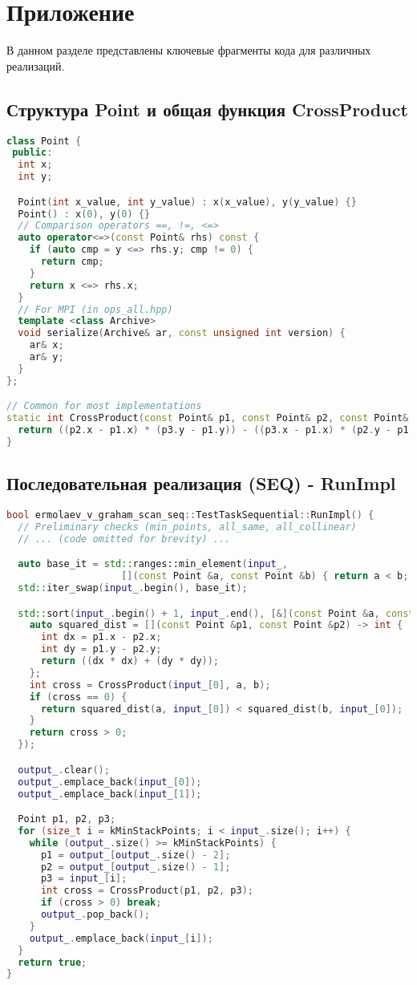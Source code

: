 \documentclass[12pt]{article}
\begin{document}
\newpage
\section{Приложение}

В данном разделе представлены ключевые фрагменты кода для различных реализаций.

\subsection{Структура Point и общая функция CrossProduct}
\begin{lstlisting}[language=C++]
class Point {
 public:
  int x;
  int y;

  Point(int x_value, int y_value) : x(x_value), y(y_value) {}
  Point() : x(0), y(0) {}
  // Comparison operators ==, !=, <=>
  auto operator<=>(const Point& rhs) const {
    if (auto cmp = y <=> rhs.y; cmp != 0) {
      return cmp;
    }
    return x <=> rhs.x;
  }
  // For MPI (in ops_all.hpp)
  template <class Archive>
  void serialize(Archive& ar, const unsigned int version) {
    ar& x;
    ar& y;
  }
};

// Common for most implementations
static int CrossProduct(const Point& p1, const Point& p2, const Point& p3) {
  return ((p2.x - p1.x) * (p3.y - p1.y)) - ((p3.x - p1.x) * (p2.y - p1.y));
}
\end{lstlisting}
\newpage
\subsection{Последовательная реализация (SEQ) - RunImpl}
\begin{lstlisting}[language=C++]
bool ermolaev_v_graham_scan_seq::TestTaskSequential::RunImpl() {
  // Preliminary checks (min_points, all_same, all_collinear)
  // ... (code omitted for brevity) ...

  auto base_it = std::ranges::min_element(input_, 
                    [](const Point &a, const Point &b) { return a < b; });
  std::iter_swap(input_.begin(), base_it);

  std::sort(input_.begin() + 1, input_.end(), [&](const Point &a, const Point &b) {
    auto squared_dist = [](const Point &p1, const Point &p2) -> int {
      int dx = p1.x - p2.x;
      int dy = p1.y - p2.y;
      return ((dx * dx) + (dy * dy));
    };
    int cross = CrossProduct(input_[0], a, b);
    if (cross == 0) {
      return squared_dist(a, input_[0]) < squared_dist(b, input_[0]);
    }
    return cross > 0;
  });

  output_.clear();
  output_.emplace_back(input_[0]);
  output_.emplace_back(input_[1]);

  Point p1, p2, p3;
  for (size_t i = kMinStackPoints; i < input_.size(); i++) {
    while (output_.size() >= kMinStackPoints) {
      p1 = output_[output_.size() - 2];
      p2 = output_[output_.size() - 1];
      p3 = input_[i];
      int cross = CrossProduct(p1, p2, p3);
      if (cross > 0) break;
      output_.pop_back();
    }
    output_.emplace_back(input_[i]);
  }
  return true;
}
\end{lstlisting}
\newpage
\end{document}
